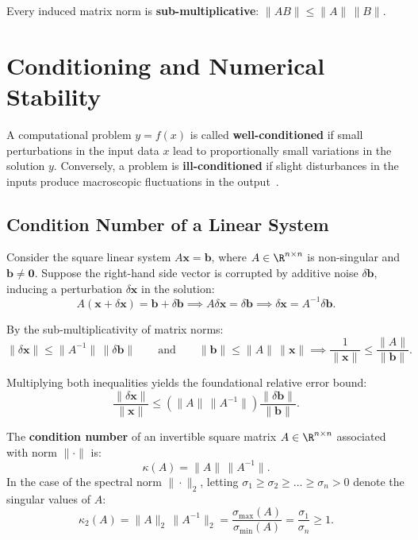 Every induced matrix norm is \textbf{sub-multiplicative}: $\|A B\| \le \|A\| \, \|B\|$.

\FloatBarrier
\section{Conditioning and Numerical Stability}

A computational problem $y = f(x)$ is called \textbf{well-conditioned} if small perturbations in the input data $x$ lead to proportionally small variations in the solution $y$. Conversely, a problem is \textbf{ill-conditioned} if slight disturbances in the inputs produce macroscopic fluctuations in the output~\cite{golub2013matrix}.

\subsection{Condition Number of a Linear System}

Consider the square linear system $A \mathbf{x} = \mathbf{b}$, where $A \in \R^{n \times n}$ is non-singular and $\mathbf{b} \ne \mathbf{0}$. Suppose the right-hand side vector is corrupted by additive noise $\delta \mathbf{b}$, inducing a perturbation $\delta \mathbf{x}$ in the solution:
\begin{equation}
    A(\mathbf{x} + \delta \mathbf{x}) = \mathbf{b} + \delta \mathbf{b} \implies A \delta \mathbf{x} = \delta \mathbf{b} \implies \delta \mathbf{x} = A^{-1} \delta \mathbf{b}.
\end{equation}

By the sub-multiplicativity of matrix norms:
\begin{equation}
    \|\delta \mathbf{x}\| \le \|A^{-1}\| \, \|\delta \mathbf{b}\| \qquad \text{and} \qquad \|\mathbf{b}\| \le \|A\| \, \|\mathbf{x}\| \implies \frac{1}{\|\mathbf{x}\|} \le \frac{\|A\|}{\|\mathbf{b}\|}.
\end{equation}

Multiplying both inequalities yields the foundational relative error bound:
\begin{equation}
    \frac{\|\delta \mathbf{x}\|}{\|\mathbf{x}\|} \le \left(\|A\| \, \|A^{-1}\|\right) \frac{\|\delta \mathbf{b}\|}{\|\mathbf{b}\|}.
\end{equation}

\begin{definition}
The \textbf{condition number} of an invertible square matrix $A \in \R^{n \times n}$ associated with norm $\|\cdot\|$ is:
\begin{equation}
    \kappa(A) = \|A\| \, \|A^{-1}\|.
\end{equation}
In the case of the spectral norm $\|\cdot\|_2$, letting $\sigma_1 \ge \sigma_2 \ge \dots \ge \sigma_n > 0$ denote the singular values of $A$:
\begin{equation}
    \kappa_2(A) = \|A\|_2 \, \|A^{-1}\|_2 = \frac{\sigma_{\max}(A)}{\sigma_{\min}(A)} = \frac{\sigma_1}{\sigma_n} \ge 1.
\end{equation}
\end{definition}

